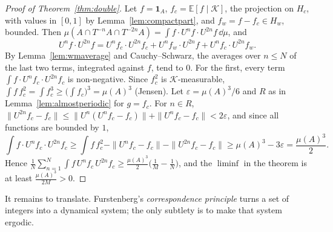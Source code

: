 \begin{proof}[Proof of Theorem~\ref{thm:double}]
Let $f=\mathbf 1_A$, $f_c=\mathbb E[f\mid\mathcal K]$, the projection on $H_c$, with values in $[0,1]$ by Lemma~\ref{lem:compactpart}, and $f_w=f-f_c\in H_w$, bounded. Then
$\mu(A\cap T^{-n}A\cap T^{-2n}A)=\int f\cdot U^nf\cdot U^{2n}f\,\dd\mu$, and
\[
U^nf\cdot U^{2n}f=U^nf_c\cdot U^{2n}f_c+U^nf_w\cdot U^{2n}f+U^nf_c\cdot U^{2n}f_w .
\]
By Lemma~\ref{lem:wmaverage} and Cauchy--Schwarz, the averages over $n\le N$ of the last two terms, integrated against $f$, tend to $0$. For the first, every term $\int f\cdot U^nf_c\cdot U^{2n}f_c$ is non-negative. Since
$f_c^2$ is $\mathcal K$-measurable, $\int f\,f_c^2=\int f_c^3\ge\bigl(\int f_c\bigr)^3=\mu(A)^3$ (Jensen). Let $\varepsilon=\mu(A)^3/6$ and $R$ as in Lemma~\ref{lem:almostperiodic} for $g=f_c$. For $n\in R$,
$\|U^{2n}f_c-f_c\|\le\|U^n(U^nf_c-f_c)\|+\|U^nf_c-f_c\|<2\varepsilon$, and since all functions are bounded by $1$,
\[
\int f\cdot U^nf_c\cdot U^{2n}f_c\ge\int f\,f_c^2-\|U^nf_c-f_c\|-\|U^{2n}f_c-f_c\|\ge\mu(A)^3-3\varepsilon=\frac{\mu(A)^3}2.
\]
Hence $\frac1N\sum_{n=1}^N\int f\,U^nf_c\,U^{2n}f_c\ge\frac{\mu(A)^3}2\bigl(\frac1M-\frac1N\bigr)$, and the $\liminf$ in the theorem is at least $\frac{\mu(A)^3}{2M}>0$.
\end{proof}

It remains to translate. Furstenberg's \emph{correspondence principle} turns a set of integers into a dynamical system; the only subtlety is to make that system ergodic.

